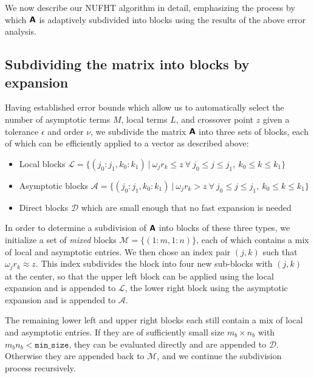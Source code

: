 
We now describe our NUFHT algorithm in detail, emphasizing the process by which
$\bm{\mathsf{A}}$ is adaptively subdivided into blocks using the results of the above
error analysis.

\subsection{Subdividing the matrix into blocks by expansion}

Having established error bounds which allow us to automatically select the
number of asymptotic terms $M$, local terms $L$, and crossover point $z$ given a
tolerance $\epsilon$ and order $\nu$, we subdivide the matrix $\bm{\mathsf{A}}$ into
three sets of blocks, each of which can be efficiently applied to a vector as
described above:
\begin{itemize}
    \item Local blocks $\mathscr{L} = \big\{ (j_0:j_1, k_0:k_1) \ | \ \omega_j
    r_k \leq z \ \forall \ j_0 \leq j \leq j_1, \ k_0 \leq k \leq k_1 \big\}$
    \item Asymptotic blocks $\mathscr{A} = \big\{ (j_0:j_1, k_0:k_1) \ | \
    \omega_j r_k > z \ \forall \ j_0 \leq j \leq j_1, \ k_0 \leq k \leq k_1
    \big\}$
    \item Direct blocks $\mathscr{D}$ which are small enough that no fast
    expansion is needed
\end{itemize}

In order to determine a subdivision of $\bm{\mathsf{A}}$ into blocks of these three
types, we initialize a set of \textit{mixed} blocks $\mathscr{M} = \{(1:m,
1:n)\}$, each of which contains a mix of local and asymptotic entries. We then
chose an index pair $(j,k)$ such that $\omega_j r_k \approx z$. This index
subdivides the block into four new sub-blocks with $(j,k)$ at the center, so
that the upper left block can be applied using the local expansion and is
appended to $\mathscr{L}$, the lower right block using the asymptotic expansion
and is appended to $\mathscr{A}$. 

The remaining lower left and upper right blocks each still contain a mix of
local and asymptotic entries. If they are of sufficiently small size $m_b \times
n_b$ with $m_b n_b < \texttt{min\_size}$, they can be evaluated directly and are
appended to $\mathscr{D}$. Otherwise they are appended back to $\mathscr{M}$,
and we continue the subdivision process recursively. 

